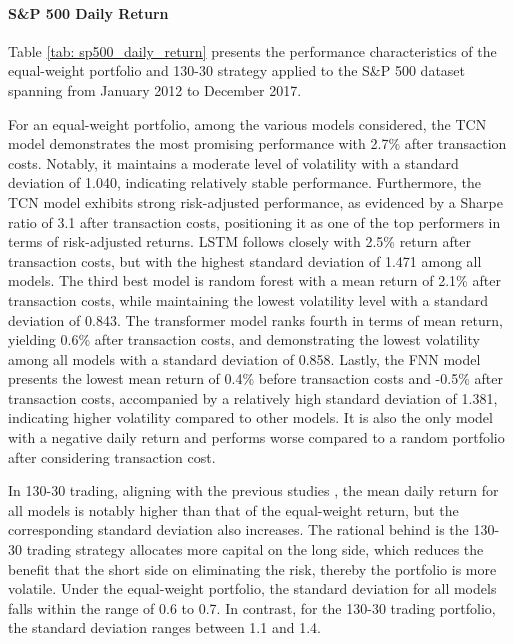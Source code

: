 \documentclass{article}
\begin{document}
\paragraph{S\&P 500 Daily Return}
Table \ref{tab: sp500_daily_return} presents the performance characteristics of the equal-weight portfolio and 130-30 strategy applied to the S\&P 500 dataset spanning from January 2012 to December 2017. 

For an equal-weight portfolio, among the various models considered, the TCN model demonstrates the most promising performance with 2.7\% after transaction costs. Notably, it maintains a moderate level of volatility with a standard deviation of 1.040, indicating relatively stable performance. Furthermore, the TCN model exhibits strong risk-adjusted performance, as evidenced by a Sharpe ratio of 3.1 after transaction costs, positioning it as one of the top performers in terms of risk-adjusted returns. LSTM follows closely with 2.5\% return after transaction costs, but with the highest standard deviation of 1.471 among all models. The third best model is random forest with a mean return of 2.1\% after transaction costs, while maintaining the lowest volatility level with a standard deviation of 0.843. The transformer model ranks fourth in terms of mean return, yielding 0.6\% after transaction costs, and demonstrating the lowest volatility among all models with a standard deviation of 0.858. Lastly, the FNN model presents the lowest mean return of 0.4\% before transaction costs and -0.5\% after transaction costs, accompanied by a relatively high standard deviation of 1.381, indicating higher volatility compared to other models. It is also the only model with a negative daily return and performs worse compared to a random portfolio after considering transaction cost. 

In 130-30 trading, aligning with the previous studies \citep{abate2022portfolio, johnson2007empirical}, the mean daily return for all models is notably higher than that of the equal-weight return, but the corresponding standard deviation also increases. The rational behind is the 130-30 trading strategy allocates more capital on the long side, which reduces the benefit that the short side on eliminating the risk, thereby the portfolio is more volatile. Under the equal-weight portfolio, the standard deviation for all models falls within the range of 0.6 to 0.7. In contrast, for the 130-30 trading portfolio, the standard deviation ranges between 1.1 and 1.4.
\end{document}
